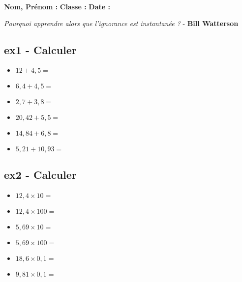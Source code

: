 



\textbf{Nom, Prénom :} \hspace{8cm} \textbf{Classe :} \hspace{3cm} \textbf{Date :}\\

\begin{center}
  \textit{Pourquoi apprendre alors que l’ignorance est instantanée ?} - \textbf{Bill Watterson}
\end{center}

\vspace{1cm}

\begin{multicols}{2} 
\subsection*{ex1 - Calculer}

\begin{itemize}[label={$\bullet$}]
  \item $12 + 4,5 = $ \dotfill \\
  \item $6,4 + 4,5 = $ \dotfill \\
  \item $2,7 + 3,8 = $ \dotfill \\
  \item $20,42 + 5,5 = $ \dotfill \\
  \item $14,84 + 6,8 = $ \dotfill \\
  \item $5,21 + 10,93 = $ \dotfill \\
\end{itemize} 

\subsection*{ex2 - Calculer}

\begin{itemize}[label={$\bullet$}]
  \item $12,4 \times 10 = $ \dotfill \\
  \item $12,4 \times 100 = $ \dotfill \\
  \item $5,69 \times 10 = $ \dotfill \\
  \item $5,69 \times 100 = $ \dotfill \\
  \item $18,6 \times 0,1 = $ \dotfill \\
  \item $9,81 \times 0,1 = $ \dotfill \\
\end{itemize} 

\end{multicols}
